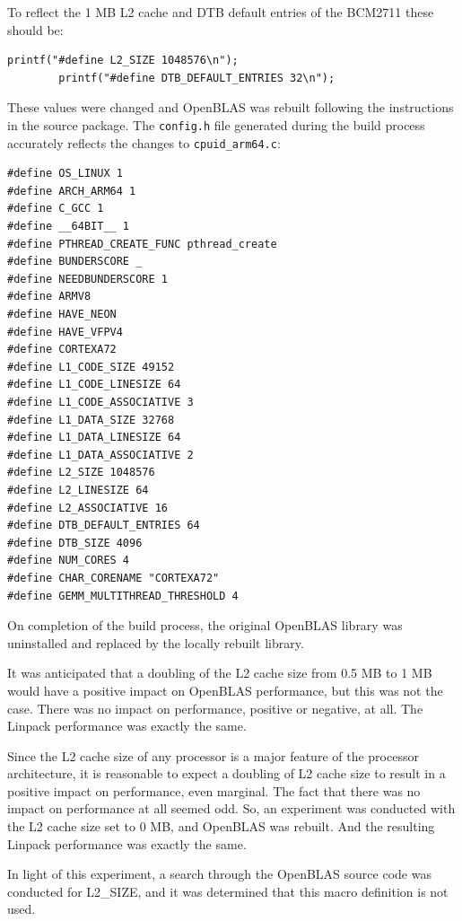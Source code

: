 \documentclass{report}
\begin{document}
To reflect the 1 MB L2 cache and DTB default entries of the BCM2711 these should be:

\lstset{style=listing}
\begin{lstlisting}[numbers=none]
		printf("#define L2_SIZE 1048576\n");
		printf("#define DTB_DEFAULT_ENTRIES 32\n");
\end{lstlisting}

These values were changed and OpenBLAS was rebuilt following the instructions in the source package. The \verb|config.h| file generated during the build process accurately reflects the changes to \verb|cpuid_arm64.c|:

\lstset{style=listing}
\begin{lstlisting}[caption=config.h]
#define OS_LINUX 1
#define ARCH_ARM64 1
#define C_GCC 1
#define __64BIT__ 1
#define PTHREAD_CREATE_FUNC pthread_create
#define BUNDERSCORE _
#define NEEDBUNDERSCORE 1
#define ARMV8
#define HAVE_NEON
#define HAVE_VFPV4
#define CORTEXA72
#define L1_CODE_SIZE 49152
#define L1_CODE_LINESIZE 64
#define L1_CODE_ASSOCIATIVE 3
#define L1_DATA_SIZE 32768
#define L1_DATA_LINESIZE 64
#define L1_DATA_ASSOCIATIVE 2
#define L2_SIZE 1048576
#define L2_LINESIZE 64
#define L2_ASSOCIATIVE 16
#define DTB_DEFAULT_ENTRIES 64
#define DTB_SIZE 4096
#define NUM_CORES 4
#define CHAR_CORENAME "CORTEXA72"
#define GEMM_MULTITHREAD_THRESHOLD 4
\end{lstlisting}

On completion of the build process, the original OpenBLAS library was uninstalled and replaced by the locally rebuilt library.

It was anticipated that a doubling of the L2 cache size from 0.5 MB to 1 MB would have a positive impact on OpenBLAS performance, but this was not the case. There was no impact on performance, positive or negative, at all. The Linpack performance was exactly the same.

Since the L2 cache size of any processor is a major feature of the processor architecture, it is reasonable to expect a doubling of L2 cache size to result in a positive impact on performance, even marginal. The fact that there was no impact on performance at all seemed odd. So, an experiment was conducted with the L2 cache size set to 0 MB, and OpenBLAS was rebuilt. And the resulting Linpack performance was exactly the same. 

In light of this experiment, a search through the OpenBLAS source code was conducted for L2\_SIZE, and it was determined that this macro definition is not used.
\end{document}
